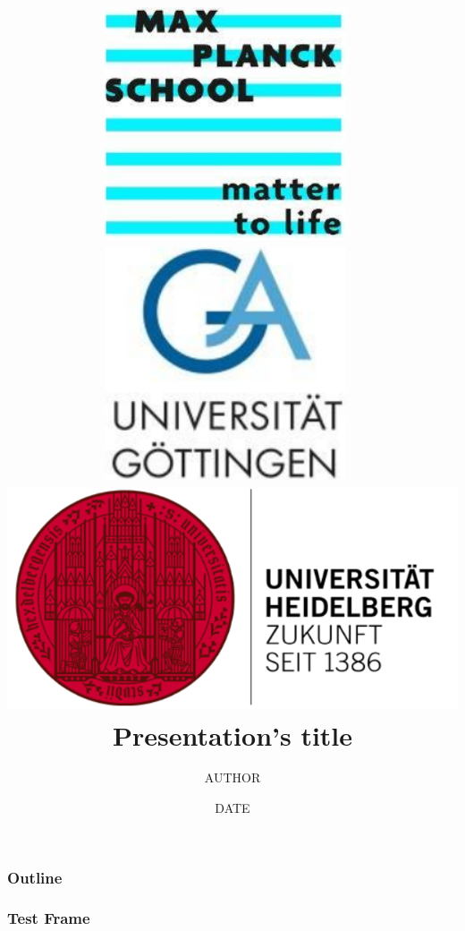 \documentclass{beamer}
\title[Title]{\includegraphics[width=0.15\linewidth]{imgs/logo/mtl.png}\hspace*{2.5cm}~%
	\includegraphics[width=0.15\linewidth]{imgs/logo/goe.png}\hspace*{2.cm}~%
	\includegraphics[height = 0.14\linewidth, width=0.27\linewidth]{imgs/logo/hei.png} \\ \vspace{1cm} Presentation's title}
\author[Author]{AUTHOR \inst{1} \inst{2}}
\institute[Institute]{\inst{1} INST 1 \and \inst{2} INST 2}
\date[DATE]{DATE}
\begin{document}
	
	
	\begin{frame}%
		\maketitle	\end{frame}
	
	
	\begin{frame}
		\frametitle{Outline}
		\tableofcontents
	\end{frame}
	\begin{frame}
		\frametitle{Test Frame}
	\end{frame}
	
		
\end{document}
